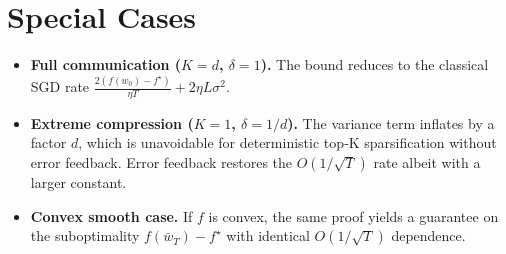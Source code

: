 \documentclass{article}
\begin{document}
\section*{Special Cases}
\begin{itemize}
\item \textbf{Full communication ($K=d$, $\delta=1$).}
  The bound reduces to the classical SGD rate
  $\frac{2(f(w_0)-f^\star)}{\eta T}+2\eta L\sigma^{2}$.
\item \textbf{Extreme compression ($K=1$, $\delta=1/d$).}
  The variance term inflates by a factor $d$, which is
  unavoidable for deterministic top‑K sparsification without
  error feedback.  Error feedback restores the $O(1/\sqrt{T})$ rate
  albeit with a larger constant.
\item \textbf{Convex smooth case.}
  If $f$ is convex, the same proof yields a guarantee on the suboptimality
  $f(\bar w_T)-f^\star$ with identical $O(1/\sqrt{T})$ dependence.
\end{itemize}
\end{document}
